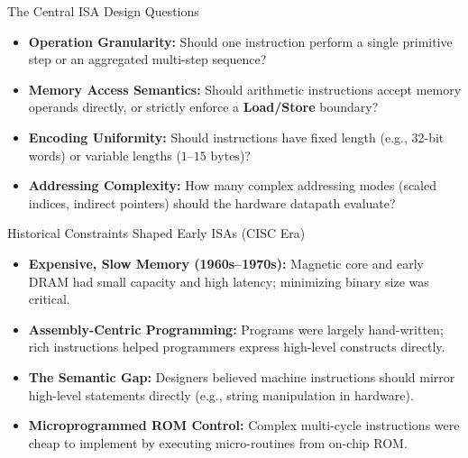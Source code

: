 \documentclass[aspectratio=169,11pt,t]{beamer}
\newcommand{\key}[1]{\textbf{#1}}
\begin{document}
\begin{frame}{The Central ISA Design Questions}
\large
\begin{itemize}\setlength{\itemsep}{8pt}
  \item \key{Operation Granularity:} Should one instruction perform a single primitive step or an aggregated multi-step sequence?
  \item \key{Memory Access Semantics:} Should arithmetic instructions accept memory operands directly, or strictly enforce a \key{Load/Store} boundary?
  \item \key{Encoding Uniformity:} Should instructions have fixed length (e.g., 32-bit words) or variable lengths ($1\text{--}15\text{ bytes}$)?
  \item \key{Addressing Complexity:} How many complex addressing modes (scaled indices, indirect pointers) should the hardware datapath evaluate?
\end{itemize}
\end{frame}


\begin{frame}{Historical Constraints Shaped Early ISAs (CISC Era)}
\large
\begin{itemize}\setlength{\itemsep}{8pt}
  \item \key{Expensive, Slow Memory (1960s--1970s):} Magnetic core and early DRAM had small capacity and high latency; minimizing binary size was critical.
  \item \key{Assembly-Centric Programming:} Programs were largely hand-written; rich instructions helped programmers express high-level constructs directly.
  \item \key{The Semantic Gap:} Designers believed machine instructions should mirror high-level statements directly (e.g., string manipulation in hardware).
  \item \key{Microprogrammed ROM Control:} Complex multi-cycle instructions were cheap to implement by executing micro-routines from on-chip ROM.
\end{itemize}
\end{frame}

\end{document}
